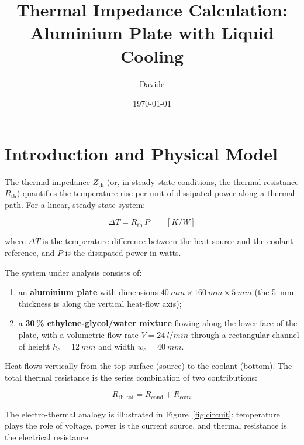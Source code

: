 \documentclass[a4paper,11pt]{article}
\title{\textbf{Thermal Impedance Calculation:\\
Aluminium Plate with Liquid Cooling}}
\author{Davide}
\date{\today}
\begin{document}
\maketitle
\tableofcontents
\bigskip

\section{Introduction and Physical Model}

The thermal impedance $Z_{\mathrm{th}}$ (or, in steady-state conditions, the thermal
resistance $R_{\mathrm{th}}$) quantifies the temperature rise per unit of dissipated
power along a thermal path. For a linear, steady-state system:

\begin{equation}
  \Delta T = R_{\mathrm{th}}\, P
  \qquad\left[\si{K/W}\right]
\end{equation}

where $\Delta T$ is the temperature difference between the heat source and the
coolant reference, and $P$ is the dissipated power in watts.

The system under analysis consists of:
\begin{enumerate}
  \item an \textbf{aluminium plate} with dimensions
        $\SI{40}{mm}\times\SI{160}{mm}\times\SI{5}{mm}$
        (the \SI{5}{mm} thickness is along the vertical heat-flow axis);
  \item a \textbf{30\,\% ethylene-glycol/water mixture} flowing along the lower
        face of the plate, with a volumetric flow rate
        $\dot{V}=\SI{24}{l/min}$ through a rectangular channel of height
        $h_c = \SI{12}{mm}$ and width $w_c = \SI{40}{mm}$.
\end{enumerate}

Heat flows vertically from the top surface (source) to the coolant (bottom).
The total thermal resistance is the series combination of two contributions:

\begin{equation}
  \boxed{R_{\mathrm{th,tot}} = R_{\mathrm{cond}} + R_{\mathrm{conv}}}
\end{equation}

The electro-thermal analogy is illustrated in Figure~\ref{fig:circuit}: temperature
plays the role of voltage, power is the current source, and thermal resistance
is the electrical resistance.
\end{document}

